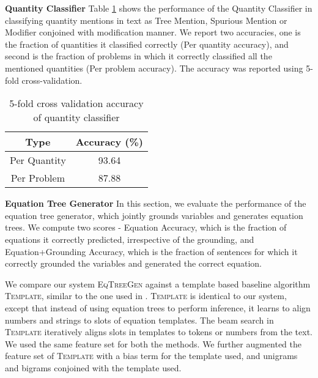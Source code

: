   \noindent \textbf{Quantity Classifier} Table \ref{tab:quantity} shows
  the performance of the Quantity Classifier in classifying quantity
  mentions in text as Tree Mention, Spurious Mention or Modifier
  conjoined with modification manner. We report two accuracies, one is
  the fraction of quantities it classified correctly (Per quantity
  accuracy), and second is the fraction of problems in which it
  correctly classified all the mentioned quantities (Per problem
  accuracy). The accuracy was reported using 5-fold cross-validation.

  \setlength{\tabcolsep}{6pt}
      \begin{table}[!ht]
        \centering \small
        \begin{tabular}{|c|c|}
          \hline 
           Type & Accuracy (\%) \\\hline
          \hline 
           Per Quantity & 93.64 \\
           Per Problem & 87.88  \\ 
          \hline
        \end{tabular}
        \caption{\footnotesize 5-fold cross validation accuracy of quantity classifier}
        \label{tab:quantity}
      \end{table}

  
  \noindent \textbf{Equation Tree Generator} In this section, we
  evaluate the performance of the equation tree generator, which
  jointly grounds variables and generates equation trees. We compute
  two scores - Equation Accuracy, which is the fraction of equations
  it correctly predicted, irrespective of the grounding, and
  Equation+Grounding Accuracy, which is the fraction of sentences for
  which it correctly grounded the variables and generated the correct
  equation. 

  We compare our system \textsc{EqTreeGen} against a template based
  baseline algorithm \textsc{Template}, similar to the one used
  in \cite{KushmanZeBa14}. \textsc{Template} is identical to our system,
  except that instead of using equation trees to perform inference, it
  learns to align numbers and strings to slots of equation templates.
  The beam search in \textsc{Template} iteratively aligns slots in
  templates to tokens or numbers from the text. We used the same
  feature set for both the methods. We further augmented the feature
  set of \textsc{Template} with a bias term for the template used, and
  unigrams and bigrams conjoined with the template used.

